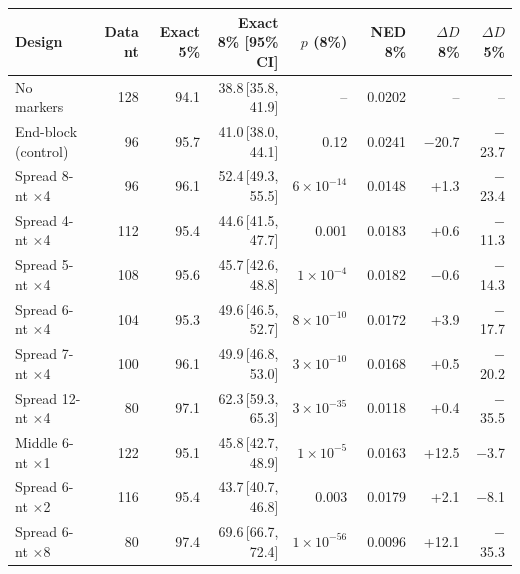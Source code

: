 \begin{tabular}{lrrrrrrr}
\hline
Design & Data nt & Exact 5\% & Exact 8\% [95\% CI] & $p$ (8\%) & NED 8\% & $\Delta D$ 8\% & $\Delta D$ 5\% \\
\hline
No markers & 128 & 94.1 & 38.8\,[35.8, 41.9] & -- & 0.0202 & -- & -- \\
End-block (control) & 96 & 95.7 & 41.0\,[38.0, 44.1] & 0.12 & 0.0241 & $-$20.7 & $-$23.7 \\
Spread 8-nt $\times$4 & 96 & 96.1 & 52.4\,[49.3, 55.5] & $6\times10^{-14}$ & 0.0148 & +1.3 & $-$23.4 \\
Spread 4-nt $\times$4 & 112 & 95.4 & 44.6\,[41.5, 47.7] & 0.001 & 0.0183 & +0.6 & $-$11.3 \\
Spread 5-nt $\times$4 & 108 & 95.6 & 45.7\,[42.6, 48.8] & $1\times10^{-4}$ & 0.0182 & $-$0.6 & $-$14.3 \\
Spread 6-nt $\times$4 & 104 & 95.3 & 49.6\,[46.5, 52.7] & $8\times10^{-10}$ & 0.0172 & +3.9 & $-$17.7 \\
Spread 7-nt $\times$4 & 100 & 96.1 & 49.9\,[46.8, 53.0] & $3\times10^{-10}$ & 0.0168 & +0.5 & $-$20.2 \\
Spread 12-nt $\times$4 & 80 & 97.1 & 62.3\,[59.3, 65.3] & $3\times10^{-35}$ & 0.0118 & +0.4 & $-$35.5 \\
Middle 6-nt $\times$1 & 122 & 95.1 & 45.8\,[42.7, 48.9] & $1\times10^{-5}$ & 0.0163 & +12.5 & $-$3.7 \\
Spread 6-nt $\times$2 & 116 & 95.4 & 43.7\,[40.7, 46.8] & 0.003 & 0.0179 & +2.1 & $-$8.1 \\
Spread 6-nt $\times$8 & 80 & 97.4 & 69.6\,[66.7, 72.4] & $1\times10^{-56}$ & 0.0096 & +12.1 & $-$35.3 \\
\hline
\end{tabular}
